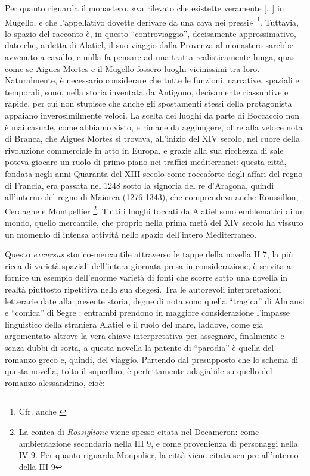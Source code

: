 Per quanto riguarda il monastero, «va rilevato che esistette veramente
{[}\ldots{}{]} in Mugello, e che l'appellativo dovette derivare da una
cava nei pressi» \footnote{\autocite[p.~254]{brancadecameron}Cfr. anche
  \autocite[p.~211]{manni1742}}. Tuttavia, lo spazio del racconto è, in
questo ``controviaggio'', decisamente approssimativo, dato che, a detta
di Alatiel, il suo viaggio dalla Provenza al monastero sarebbe avvenuto
a cavallo, e nulla fa pensare ad una tratta realisticamente lunga, quasi
come se Aigues Mortes e il Mugello fossero luoghi vicinissimi tra loro.
Naturalmente, è necessario considerare che tutte le funzioni, narrative,
spaziali e temporali, sono, nella storia inventata da Antigono,
decisamente riassuntive e rapide, per cui non stupisce che anche gli
spostamenti stessi della protagonista appaiano inverosimilmente veloci.
La scelta dei luoghi da parte di Boccaccio non è mai casuale, come
abbiamo visto, e rimane da aggiungere, oltre alla veloce nota di Branca,
che Aigues Mortes si trovava, all'inizio del XIV secolo, nel cuore della
rivoluzione commerciale in atto in Europa, e grazie alla sua ricchezza
di sale poteva giocare un ruolo di primo piano nei traffici
mediterranei: questa città, fondata negli anni Quaranta del XIII secolo
come roccaforte degli affari del regno di Francia, era passata nel 1248
sotto la signoria del re d'Aragona, quindi all'interno del regno di
Maiorca (1276-1343), che comprendeva anche Roussillon, Cerdagne e
Montpellier \footnote{La contea di \emph{Rossiglione} viene spesso
  citata nel Decameron: come ambientazione secondaria nella III 9, e
  come provenienza di personaggi nella IV 9. Per quanto riguarda
  Monpulier, la città viene citata sempre all'interno della III 9}.
Tutti i luoghi toccati da Alatiel sono emblematici di un mondo, quello
mercantile, che proprio nella prima metà del XIV secolo ha vissuto un
momento di intensa attività nello spazio dell'intero Mediterraneo.

Questo \emph{excursus} storico-mercantile attraverso le tappe della
novella II 7, la più ricca di varietà spaziali dell'intera giornata
presa in considerazione, è servita a fornire un esempio dell'enorme
varietà di fonti che scorre sotto una novella in realtà piuttosto
ripetitiva nella sua diegesi. Tra le autorevoli interpretazioni
letterarie date alla presente storia, degne di nota sono quella
``tragica'' di Almansi \autocite[pp.~82-131]{almansi1974} e ``comica''
di Segre \autocite[pp.~145-159]{segre1974}: entrambi prendono in
maggiore considerazione l'impasse linguistico della straniera Alatiel e
il ruolo del mare, laddove, come già argomentato altrove
\autocite{bolpagni2016} la vera chiave interpretativa per assegnare,
finalmente e senza dubbi di sorta, a questa novella la patente di
``parodia'' è quella del romanzo greco e, quindi, del viaggio. Partendo
dal presupposto che lo schema di questa novella, tolto il superfluo, è
perfettamente adagiabile su quello del romanzo alessandrino, cioè:

